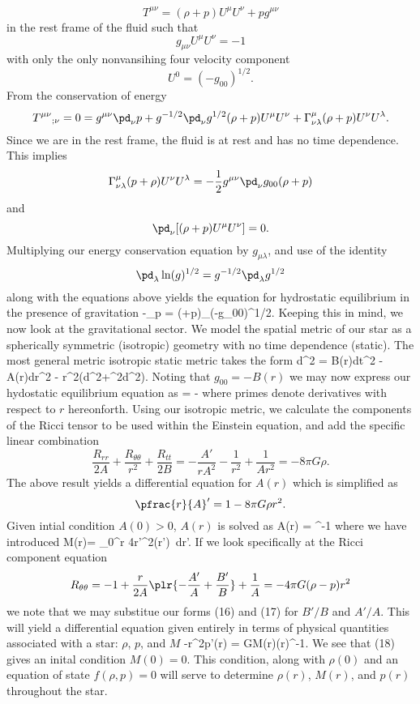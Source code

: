 \documentclass[10pt,letterpaper]{article}
\begin{document}
\[
	T^{\mu\nu} = (\rho+p)U^\mu U^\nu + pg^{\mu\nu}
\]
in the rest frame of the fluid such that
\[
	g_{\mu\nu}U^\mu U^\nu = -1
\]
with only the only nonvansihing four velocity component
\[
	U^0 = (-g_{00})^{1/2}.
\]
From the conservation of energy 
\[
	T^{\mu\nu}{}_{;\nu} = 0 =g^{\mu\nu}\pd_\nu p + g^{-1/2} \pd_\nu g^{1/2}(\rho+p)U^\mu U^\nu + \Gamma^\mu_{\nu\lambda}(\rho+p)U^\nu U^\lambda.
\]
Since we are in the rest frame, the fluid is at rest and has no time dependence. This implies
\[
	\Gamma^\mu_{\nu\lambda}(p+\rho)U^\nu U^\lambda = -\frac12 g^{\mu\nu} \pd_\nu g_{00}(\rho+p)
\]
and
\[
	\pd_\nu[(\rho+p)U^\mu U^\nu] = 0.
\]
Multiplying our energy conservation equation by $g_{\mu\lambda}$,  and use of the identity
\[
	\pd_\lambda \ln(g)^{1/2} = g^{-1/2}\pd_\lambda g^{1/2}
\]
along with the equations above yields the equation for hydrostatic equilibrium in the presence of gravitation
\be
	-\pd_\lambda p = (\rho+p)\pd_\lambda \ln(-g_{00})^{1/2}.
\ee
Keeping this in mind, we now look at the gravitational sector. We model the spatial metric of our star as a spherically symmetric (isotropic) geometry with no time dependence (static). The most general metric isotropic static metric takes the form
\be
	d\tau^2 = B(r)dt^2 - A(r)dr^2 - r^2(d\theta^2+\sin^2\theta d\phi^2).
\ee
Noting that $g_{00} = -B(r)$ we may now express our hydostatic equilibrium equation as
\be 
	 = -
\ee
where primes denote derivatives with respect to $r$ hereonforth. Using our isotropic metric, we calculate the components of the Ricci tensor to be used within the Einstein equation, and add the specific linear combination
\[
	\frac{R_{rr}}{2A}+\frac{R_{\theta\theta}}{r^2}+\frac{R_{tt}}{2B} = -\frac{A'}{rA^2}-\frac{1}{r^2}+\frac{1}{Ar^2} = -8\pi G\rho.
\]
The above result yields a differential equation for $A(r)$ which is simplified as
\[
	\pfrac{r}{A}' = 1-8\pi G\rho r^2.
\]
Given intial condition $A(0)>0$, $A(r)$ is solved as
\be
	A(r) = ^{-1}
\ee
where we have introduced
\be
	M(r)= \int_0^r 4\pi r'^2\rho(r')\ dr'.
\ee
If we look specifically at the Ricci component equation
\[
	R_{\theta\theta} = -1 + \frac{r}{2A}\plr{ -\frac{A'}{A} + \frac{B'}{B}}+\frac1A = -4\pi G(\rho-p)r^2
\]
we note that we may substitue our forms (16) and (17) for $B'/B$ and $A'/A$. This will yield a differential equation given entirely in terms of physical quantities associated with a star: $\rho$, $p$, and $M$
\be
	-r^2p'(r) = GM(r)\rho(r)^{-1}.
\ee
We see that (18) gives an inital condition $M(0) = 0$. This condition, along with $\rho(0)$ and an equation of state $f(\rho,p)=0$ will serve to determine $\rho(r)$, $M(r)$, and $p(r)$ throughout the star. 
\end{document}
